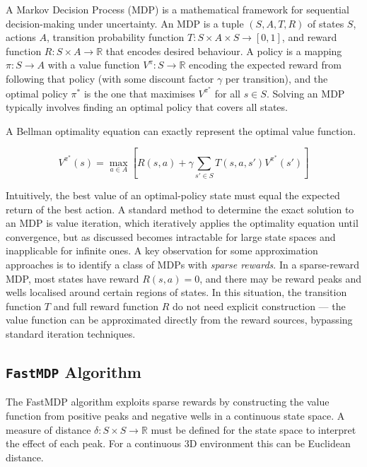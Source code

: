 A Markov Decision Process (MDP) is a mathematical framework for sequential decision-making under uncertainty. An MDP is a tuple $(S, A, T, R)$ of states $S$, actions $A$, transition probability function $T : S \times A \times S \to [0,1]$, and reward function $R : S \times A \to \mathbb{R}$ that encodes desired behaviour. A policy is a mapping $\pi : S \to A$ with a value function $V^\pi : S \to \mathbb{R}$ encoding the expected reward from following that policy (with some discount factor $\gamma$ per transition), and the optimal policy $\pi^*$ is the one that maximises $V^{\pi^*}$ for all $s \in S$. Solving an MDP typically involves finding an optimal policy that covers all states.

A Bellman optimality equation can exactly represent the  optimal value function\cite{bellman1957}.

\begin{equation}
V^{\pi^*}(s) = \max_{a \in A} \left[ R(s,a) + \gamma \sum_{s' \in S} T(s, a, s')V^{\pi^*}(s') \right]
\label{eq:value_bellman}
\end{equation}

Intuitively, the best value of an optimal-policy state must equal the expected return of the best action\cite{sutton1998}. A standard method to determine the exact solution to an MDP is value iteration, which iteratively applies the optimality equation until convergence, but as discussed becomes intractable for large state spaces and inapplicable for infinite ones. A key observation for some approximation approaches is to identify a class of MDPs with \textit{sparse rewards}. In a sparse-reward MDP, most states have reward $R(s, a) = 0$, and there may be reward peaks and wells localised around certain regions of states. In this situation, the transition function $T$ and full reward function $R$ do not need explicit construction --- the value function can be approximated directly from the reward sources, bypassing standard iteration techniques.

\subsection{\texttt{FastMDP} Algorithm}
\label{sec:2.3.2}

The FastMDP algorithm exploits sparse rewards by constructing the value function from positive peaks and negative wells in a continuous state space. A measure of distance $\delta : S \times S \to \mathbb{R}$ must be defined for the state space to interpret the effect of each peak. For a continuous 3D environment this can be Euclidean distance. 

